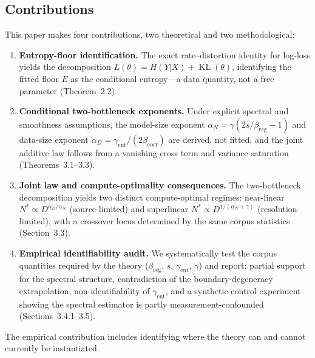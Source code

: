 \documentclass[entropy,article,submit,moreauthors,pdftex]{mdpi}
\newcommand{\KL}{\operatorname{KL}}
\begin{document}
\subsection{Contributions}
This paper makes four contributions, two theoretical and two methodological:
\begin{enumerate}[label=\textbf{(\roman*)}]
\item \textbf{Entropy-floor identification.}
  The exact rate--distortion identity for log-loss yields the decomposition
  $L(\theta)=H(Y|X)+\overline{\KL}(\theta)$, identifying the fitted floor $E$
  as the conditional entropy---a data quantity, not a free parameter
  (Theorem~2.2).
\item \textbf{Conditional two-bottleneck exponents.}
  Under explicit spectral and smoothness assumptions, the model-size exponent
  $\alpha_N=\gamma(2s/\beta_{\mathrm{reg}}-1)$ and data-size exponent
  $\alpha_D=\gamma_{\mathrm{ent}}/(2\beta_{\mathrm{corr}})$ are derived, not fitted, and
  the joint additive law follows from a vanishing cross term and variance
  saturation (Theorems~3.1--3.3).
\item \textbf{Joint law and compute-optimality consequences.}
  The two-bottleneck decomposition yields two distinct compute-optimal regimes:
  near-linear $N^*\!\propto\!D^{\alpha_D/\alpha_N}$ (source-limited) and
  superlinear $N^*\!\propto\!D^{1/(\alpha_N+\gamma)}$ (resolution-limited), with
  a crossover locus determined by the same corpus statistics
  (Section~3.3).
\item \textbf{Empirical identifiability audit.}
  We systematically test the corpus quantities required by the theory
  ($\beta_{\mathrm{reg}}$, $s$, $\gamma_{\mathrm{ent}}$, $\gamma$) and report: partial
  support for the spectral structure, contradiction of the boundary-degeneracy
  extrapolation, non-identifiability of $\gamma_{\mathrm{ent}}$, and a
  synthetic-control experiment showing the spectral estimator is partly
  measurement-confounded
  (Sections~3.4.1--3.5).
\end{enumerate}
The empirical contribution includes identifying where the theory can and
cannot currently be instantiated.
\end{document}
